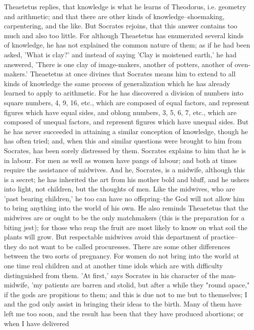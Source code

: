 Theaetetus replies, that knowledge is what he learns of Theodorus,
i.e. geometry and arithmetic; and that there are other kinds of
knowledge--shoemaking, carpentering, and the like. But Socrates rejoins,
that this answer contains too much and also too little. For although
Theaetetus has enumerated several kinds of knowledge, he has not
explained the common nature of them; as if he had been asked, 'What is
clay?' and instead of saying 'Clay is moistened earth,' he had answered,
'There is one clay of image-makers, another of potters, another of
oven-makers.' Theaetetus at once divines that Socrates means him to
extend to all kinds of knowledge the same process of generalization
which he has already learned to apply to arithmetic. For he has
discovered a division of numbers into square numbers, 4, 9, 16, etc.,
which are composed of equal factors, and represent figures which have
equal sides, and oblong numbers, 3, 5, 6, 7, etc., which are composed of
unequal factors, and represent figures which have unequal sides. But
he has never succeeded in attaining a similar conception of knowledge,
though he has often tried; and, when this and similar questions were
brought to him from Socrates, has been sorely distressed by them.
Socrates explains to him that he is in labour. For men as well as
women have pangs of labour; and both at times require the assistance of
midwives. And he, Socrates, is a midwife, although this is a secret; he
has inherited the art from his mother bold and bluff, and he ushers into
light, not children, but the thoughts of men. Like the midwives, who are
'past bearing children,' he too can have no offspring--the God will not
allow him to bring anything into the world of his own. He also reminds
Theaetetus that the midwives are or ought to be the only matchmakers
(this is the preparation for a biting jest); for those who reap the
fruit are most likely to know on what soil the plants will grow. But
respectable midwives avoid this department of practice--they do not want
to be called procuresses. There are some other differences between the
two sorts of pregnancy. For women do not bring into the world at one
time real children and at another time idols which are with difficulty
distinguished from them. 'At first,' says Socrates in his character of
the man-midwife, 'my patients are barren and stolid, but after a while
they "round apace," if the gods are propitious to them; and this is due
not to me but to themselves; I and the god only assist in bringing their
ideas to the birth. Many of them have left me too soon, and the result
has been that they have produced abortions; or when I have delivered
